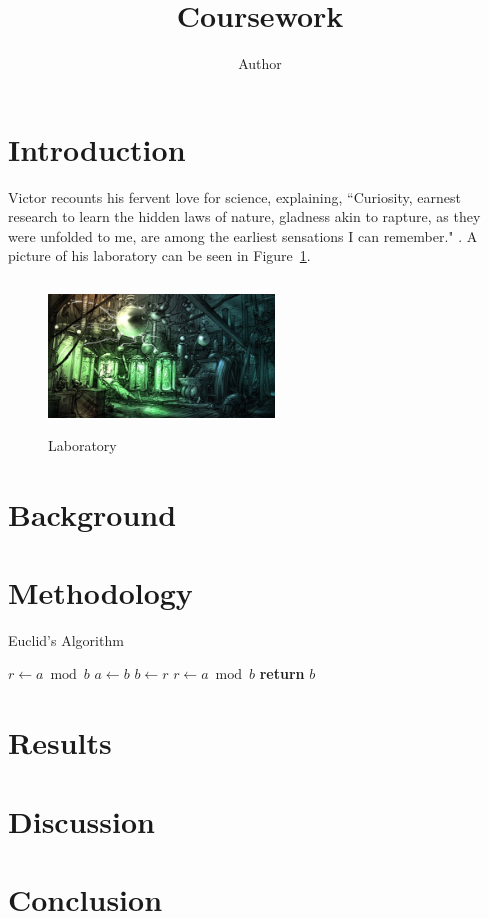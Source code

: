 \documentclass[coverpage]{inftechrep}
\begin{document}
\title{Coursework}
\author{Author}
\maketitle

\section{Introduction}
\label{sec:intro}

Victor recounts his fervent love for science, explaining, ``Curiosity, earnest research to learn the hidden laws of nature, gladness akin to rapture, as they were unfolded to me, are among the earliest sensations I can remember." \citep{shelley1994frankenstein}. A picture of his laboratory can be seen in Figure~\ref{fig:lab}.

\begin{figure}[h]
	\centering
	\includegraphics[width=6cm, height=4cm]{lab.jpg}
	\caption{Laboratory}
	\label{fig:lab}
\end{figure}

\section{Background}
\label{sec:back}

\section{Methodology}
\label{sec:method}

\begin{algorithm}
\caption{Euclid's Algorithm}\label{alg:euclid}
\begin{algorithmic}[1]
\State $r\gets a\bmod b$
\State $a\gets b$
\State $b\gets r$
\State $r\gets a\bmod b$
\EndWhile
\State \textbf{return} $b$
\EndProcedure
\end{algorithmic}
\end{algorithm}

\section{Results}
\label{sec:results}

\section{Discussion}
\label{sec:discuss}

\section{Conclusion}
\label{sec:conc}

\newpage

\end{document}
